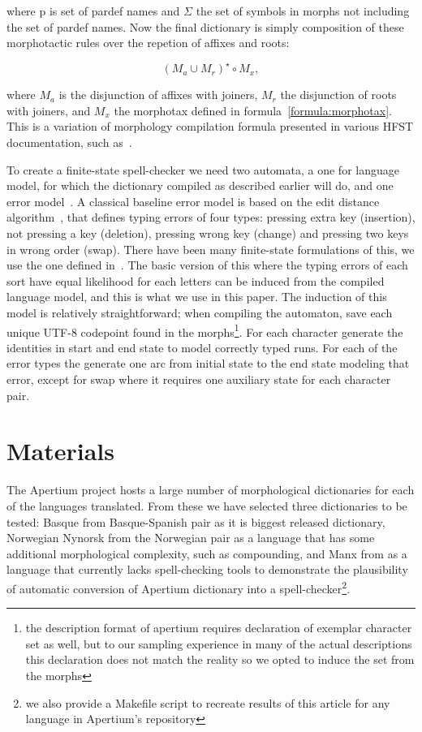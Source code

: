 \documentclass[10pt,a4paper]{article}
\begin{document}
where p is set of pardef names and $\Sigma$ the set
of symbols in morphs not including the set of pardef names.  Now the final
dictionary is simply composition of these morphotactic rules over the repetion
of affixes and roots:

\begin{equation}\label{formula:lexical}
(M_a \cup M_r)^{\star} \circ M_x,
\end{equation}

where $M_{a}$ is the disjunction of affixes with joiners, $M_{r}$ the
disjunction of roots with joiners, and $M_x$ the morphotax defined in
formula~\ref{formula:morphotax}. This is a variation of morphology compilation
formula presented in various HFST documentation, such as~\cite{hfst/2011}.

To create a finite-state spell-checker we need two automata, a one for language
model, for which the dictionary compiled as described earlier will do, and one
error model~\cite{pirinen/2010/lrec}. A classical baseline error model is based
on the edit distance algorithm~\cite{levenshtein/1966,damerau/1964}, that
defines typing errors of four types: pressing extra key (insertion), not
pressing a key (deletion), pressing wrong key (change) and pressing two keys in
wrong order (swap). There have been many finite-state formulations of this, we
use the one defined in~\cite{schulz/2002,pirinen/2010/lrec}. The basic version
of this where the typing errors of each sort have equal likelihood for each
letters can be induced from the compiled language model, and this is what we
use in this paper. The induction of this model is relatively straightforward;
when compiling the automaton, save each unique UTF-8 codepoint found in the
morphs\footnote{the description format of apertium requires declaration of
exemplar character set as well, but to our sampling experience in many of the
actual descriptions this declaration does not match the reality so we opted to
induce the set from the morphs}. For each character generate the identities in
start and end state to model correctly typed runs. For each of the error types
the generate one arc from initial state to the end state modeling that error,
except for swap where it requires one auxiliary state for each character pair.

\section{Materials}
\label{sec:materials}

The Apertium project hosts a large number of morphological dictionaries for
each of the languages translated. From these we have selected three
dictionaries to be tested: Basque from Basque-Spanish pair as it is biggest
released dictionary, Norwegian Nynorsk from the Norwegian pair as a language
that has some additional morphological complexity, such as compounding, and
Manx from  as a language that currently lacks spell-checking tools to
demonstrate the plausibility of automatic conversion of Apertium dictionary
into a spell-checker\footnote{we also provide a Makefile script to
recreate results of this article for any language in Apertium's repository}.
\end{document}
